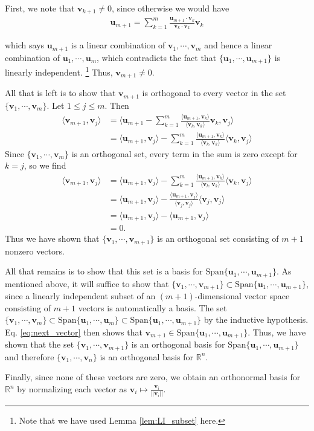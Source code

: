 \documentclass[12pt,letterpaper,reqno]{article}
\numberwithin{equation}{section}
\newcommand{\bv}{\mathbf{v}}
\newcommand{\bu}{\mathbf{u}}
\begin{document}
\begin{pf}
First, we note that $\bv_{k+1} \neq 0$, since otherwise we would have 
\begin{align*}
	\bu_{m+1}=\sum_{k=1}^m\frac{\bu_{m+1} \cdot \bv_k}{\bv_k \cdot \bv_k }\bv_k
\end{align*}

which says $\bu_{m+1}$ is a linear combination of $\bv_1,\cdots,\bv_m$ and hence a linear combination of $\bu_1,\cdots,\bu_m$, which contradicts the fact that $\{\bu_1,\cdots,\bu_{m+1}\}$ is linearly independent. \footnote{Note that we have used Lemma \ref{lem:LI_subset} here.} Thus, $\bv_{m+1} \neq 0$. 

All that is left is to show that $\bv_{m+1}$ is orthogonal to every vector in the set $\{\bv_1,\cdots,\bv_m\}$. Let $1 \leq j \leq m$. Then 
\begin{align*}
	\langle \bv_{m+1},\bv_j\rangle &=\langle \bu_{m+1}-\sum_{k=1}^{m}\frac{\langle \bu_{m+1},\bv_k\rangle}{\langle \bv_k,\bv_k \rangle}\bv_k, \bv_j \rangle \\
	&=\langle \bu_{m+1},\bv_j\rangle-\sum_{k=1}^{m}\frac{\langle \bu_{m+1},\bv_k\rangle}{\langle \bv_k,\bv_k \rangle}\langle \bv_k,\bv_j\rangle
\end{align*}
Since $\{\bv_1,\cdots, \bv_m\}$ is an orthogonal set, every term in the sum is zero except for $k=j$, so we find
\begin{align*}
	\langle \bv_{m+1},\bv_j\rangle &=\langle \bu_{m+1},\bv_j\rangle-\sum_{k=1}^{m}\frac{\langle \bu_{m+1},\bv_k\rangle}{\langle \bv_k,\bv_k \rangle}\langle \bv_k,\bv_j\rangle \\
	&=\langle \bu_{m+1},\bv_j\rangle-\frac{\langle \bu_{m+1},\bv_{j}\rangle}{\langle \bv_{j},\bv_{j}\rangle}\langle \bv_{j}, \bv_j \rangle \\
	&=\langle \bu_{m+1},\bv_j\rangle-\langle \bu_{m+1},\bv_{j}\rangle \\
	&=0.
\end{align*}
Thus we have shown that $\{\bv_1,\cdots,\bv_{m+1}\}$ is an orthogonal set consisting of $m+1$ nonzero vectors. 

All that remains is to show that this set is a basis for $\text{Span}\{\bu_1,\cdots,\bu_{m+1}\}$. As mentioned above, it will suffice to show that $\{\bv_1,\cdots,\bv_{m+1}\} \subset  \text{Span}\{\bu_1,\cdots,\bu_{m+1}\}$, since a linearly independent subset of an $(m+1)$-dimensional vector space consisting of $m+1$ vectors is automatically a basis. The set $\{\bv_1,\cdots,\bv_m\} \subset   \text{Span}\{\bu_1,\cdots,\bu_{m}\} \subset\text{Span}\{\bu_1,\cdots,\bu_{m+1}\}$ by the inductive hypothesis. Eq. \eqref{eq:next_vector} then shows that $\bv_{m+1} \in \text{Span}\{\bu_1,\cdots,\bu_{m+1}\}$. Thus, we have shown that the set $\{\bv_1,\cdots,\bv_{m+1}\}$ is an orthogonal basis for $\text{Span}\{\bu_1,\cdots,\bu_{m+1}\}$ and therefore $\{\bv_1,\cdots,\bv_{n}\}$ is an orthogonal basis for $\mathbb{R}^n$.

Finally, since none of these vectors are zero, we obtain an orthonormal basis for $\mathbb{R}^n$ by normalizing each vector as $\bv_i \mapsto \frac{\bv_i}{||\bv_i||}$.
\end{pf}
\end{document}

